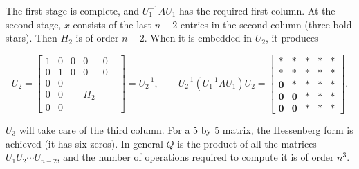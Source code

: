The first stage is complete, and \(U_{1}^{-1}AU_{1}\) has the required first column. At the second stage, \(x\) consists of the last \(n-2\) entries in the second column (three bold stars). Then \(H_{2}\) is of order \(n-2\). When it is embedded in \(U_{2}\), it produces

\[U_{2}=\begin{bmatrix}1&0&0&0&0\\ 0&1&0&0&0\\ 0&0&&&&\\ 0&0&&H_{2}&\\ 0&0&&&&\end{bmatrix}=U_{2}^{-1},\qquad U_{2}^{-1}(U_{1}^{-1}AU_{1})U_{2}= \begin{bmatrix}*&*&*&*&*\\ *&*&*&*&*\\ \mathbf{0}&*&*&*&*\\ \mathbf{0}&\mathbf{0}&*&*&*\\ \mathbf{0}&\mathbf{0}&*&*&*\end{bmatrix}.\]

\(U_{3}\) will take care of the third column. For a 5 by 5 matrix, the Hessenberg form is achieved (it has six zeros). In general \(Q\) is the product of all the matrices \(U_{1}U_{2}\cdots U_{n-2}\), and the number of operations required to compute it is of order \(n^{3}\).

 